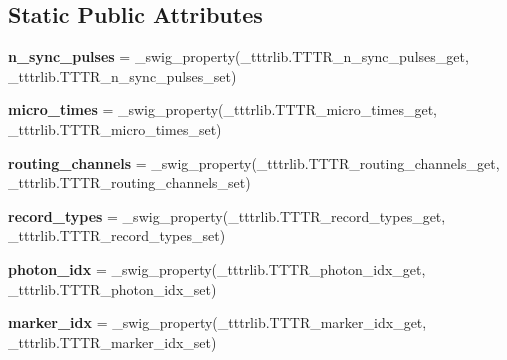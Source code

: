 \subsection*{Static Public Attributes}
\begin{DoxyCompactItemize}
\item 
\mbox{\label{classtttrlib_1_1_t_t_t_r_a84d0b933fefe8b403be9c930437c55b8}} 
{\bfseries n\+\_\+sync\+\_\+pulses} = \+\_\+swig\+\_\+property(\+\_\+tttrlib.\+T\+T\+T\+R\+\_\+n\+\_\+sync\+\_\+pulses\+\_\+get, \+\_\+tttrlib.\+T\+T\+T\+R\+\_\+n\+\_\+sync\+\_\+pulses\+\_\+set)
\item 
\mbox{\label{classtttrlib_1_1_t_t_t_r_a669aa7a72d04810c6268e8b646656d7c}} 
{\bfseries micro\+\_\+times} = \+\_\+swig\+\_\+property(\+\_\+tttrlib.\+T\+T\+T\+R\+\_\+micro\+\_\+times\+\_\+get, \+\_\+tttrlib.\+T\+T\+T\+R\+\_\+micro\+\_\+times\+\_\+set)
\item 
\mbox{\label{classtttrlib_1_1_t_t_t_r_a7f95547f3ff61b712203fda13658ccbd}} 
{\bfseries routing\+\_\+channels} = \+\_\+swig\+\_\+property(\+\_\+tttrlib.\+T\+T\+T\+R\+\_\+routing\+\_\+channels\+\_\+get, \+\_\+tttrlib.\+T\+T\+T\+R\+\_\+routing\+\_\+channels\+\_\+set)
\item 
\mbox{\label{classtttrlib_1_1_t_t_t_r_a08f443faf33d2f1f61b88cd83ecd3d4a}} 
{\bfseries record\+\_\+types} = \+\_\+swig\+\_\+property(\+\_\+tttrlib.\+T\+T\+T\+R\+\_\+record\+\_\+types\+\_\+get, \+\_\+tttrlib.\+T\+T\+T\+R\+\_\+record\+\_\+types\+\_\+set)
\item 
\mbox{\label{classtttrlib_1_1_t_t_t_r_a2ada2c29fb3eddcf7e4ad2c953fcbbb3}} 
{\bfseries photon\+\_\+idx} = \+\_\+swig\+\_\+property(\+\_\+tttrlib.\+T\+T\+T\+R\+\_\+photon\+\_\+idx\+\_\+get, \+\_\+tttrlib.\+T\+T\+T\+R\+\_\+photon\+\_\+idx\+\_\+set)
\item 
\mbox{\label{classtttrlib_1_1_t_t_t_r_ab550a2cff8b6e5150f0bc46d65b0d5fe}} 
{\bfseries marker\+\_\+idx} = \+\_\+swig\+\_\+property(\+\_\+tttrlib.\+T\+T\+T\+R\+\_\+marker\+\_\+idx\+\_\+get, \+\_\+tttrlib.\+T\+T\+T\+R\+\_\+marker\+\_\+idx\+\_\+set)
\item 
\mbox{\label{classtttrlib_1_1_t_t_t_r_ad4f99eedbdad6df0cd0bb8be27abd965}} 

\end{DoxyCompactItemize}
